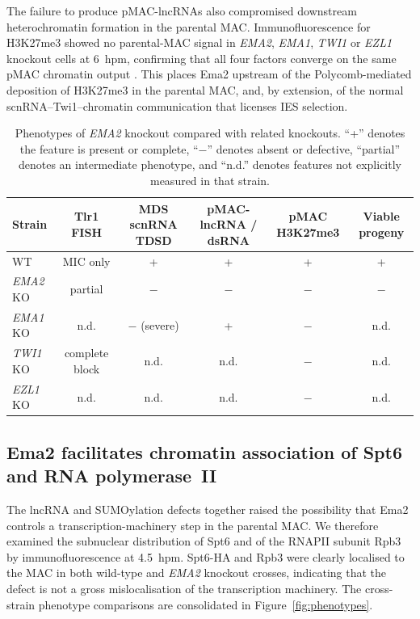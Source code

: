\documentclass[11pt]{article}
\begin{document}
The failure to produce pMAC-lncRNAs also compromised downstream
heterochromatin formation in the parental MAC. Immunofluorescence for
H3K27me3 showed no parental-MAC signal in \emph{EMA2}, \emph{EMA1},
\emph{TWI1} or \emph{EZL1} knockout cells at 6~hpm, confirming that all
four factors converge on the same pMAC chromatin output
\citep{liu2004h3k9,liu2007rnai,frapporti2019ezl1}. This places Ema2
upstream of the Polycomb-mediated deposition of H3K27me3 in the parental
MAC, and, by extension, of the normal scnRNA--Twi1--chromatin
communication that licenses IES selection.

\begin{table}[htbp]
\centering
\caption{Phenotypes of \emph{EMA2} knockout compared with related
knockouts. ``+'' denotes the feature is present or complete, ``$-$''
denotes absent or defective, ``partial'' denotes an intermediate
phenotype, and ``n.d.'' denotes features not explicitly measured in that
strain.}
\label{tab:tab2}
\begin{tabular}{lccccc}
\toprule
Strain & Tlr1 FISH & MDS scnRNA TDSD & pMAC-lncRNA / dsRNA & pMAC H3K27me3 & Viable progeny \\
\midrule
WT & MIC only & + & + & + & + \\
\emph{EMA2} KO & partial & $-$ & $-$ & $-$ & $-$ \\
\emph{EMA1} KO & n.d. & $-$ (severe) & + & $-$ & n.d. \\
\emph{TWI1} KO & complete block & n.d. & n.d. & $-$ & n.d. \\
\emph{EZL1} KO & n.d. & n.d. & n.d. & $-$ & n.d. \\
\bottomrule
\end{tabular}
\end{table}

\subsection{Ema2 facilitates chromatin association of Spt6 and
RNA polymerase~II}

The lncRNA and SUMOylation defects together raised the possibility that
Ema2 controls a transcription-machinery step in the parental MAC. We
therefore examined the subnuclear distribution of Spt6 and of the RNAPII
subunit Rpb3 by immunofluorescence at 4.5~hpm. Spt6-HA and Rpb3 were
clearly localised to the MAC in both wild-type and \emph{EMA2} knockout
crosses, indicating that the defect is not a gross mislocalisation of
the transcription machinery. The cross-strain phenotype comparisons are
consolidated in Figure~\ref{fig:phenotypes}.
\end{document}
